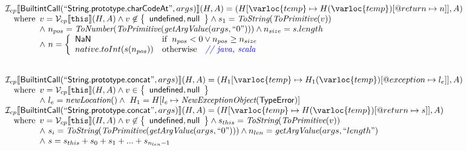 \[\begin{array}{l}
\I _{cp}\lbr \SF{BuiltintCall}(``\SF{String.prototype.charCodeAt}",args)\rbr(H,A)
 = (H[\varloc{temp}\mapsto H(\varloc{temp})[\varprop{return}\mapsto n]], A) \\
\quad\wherec{
  v = \V _{cp}\lbr \TT{this}\rbr (H,A) \land v \not\in \set{\SF{undefined}, \SF{null}}
  \land s_1 = \hf{ToString}(\hf{ToPrimitive}(v))\\
  \land\ n_{pos} = \hf{ToNumber}(\hf{ToPrimitive}(\hf{getArgValue}(args, ``0"))) \land n_{size} = s.length\\
  \land\ n = \left\{\begin{array}{ll}
      \SF{NaN} & \ifc{n_{pos} < 0 \lor n_{pos} \geq n_{size}}\\
     native.toInt(s(n_{pos})) & \owc\quad\comment{{\inblue // java, scala}}\\
    \end{array}\right.
  }\\
\\\\

\I _{cp}\lbr \SF{BuiltintCall}(``\SF{String.prototype.concat}",args)\rbr(H,A)
 = (H_1[\varloc{temp}\mapsto H_1(\varloc{temp})[\varprop{exception}\mapsto l_e]], A) \\
\quad\wherec{
  v = \V _{cp}\lbr \TT{this}\rbr (H,A) \land v \in \set{\SF{undefined}, \SF{null}}\\
  \land\ l_e = \hf{newLocation}() \land\ H_1=H[l_e\mapsto\hf{NewExceptionObject}(\SF{TypeError})] 
  }\\
  
\I _{cp}\lbr \SF{BuiltintCall}(``\SF{String.prototype.concat}",args)\rbr(H,A)
 = (H[\varloc{temp}\mapsto H(\varloc{temp})[\varprop{return}\mapsto s]], A) \\
\quad\wherec{
  v = \V _{cp}\lbr \TT{this}\rbr (H,A) \land v \not\in \set{\SF{undefined}, \SF{null}}
  \land s_{this} = \hf{ToString}(\hf{ToPrimitive}(v))\\
  \land\ s_{i} = \hf{ToString}(\hf{ToPrimitive}(\hf{getArgValue}(args, ``0")))
  \land n_{len} = \hf{getArgValue}(args, ``length")\\
  \land\ s = s_{this} + s_0 + s_1 + ... + s_{n_{len}-1}
  }\\
\\\\
\end{array}
\]


